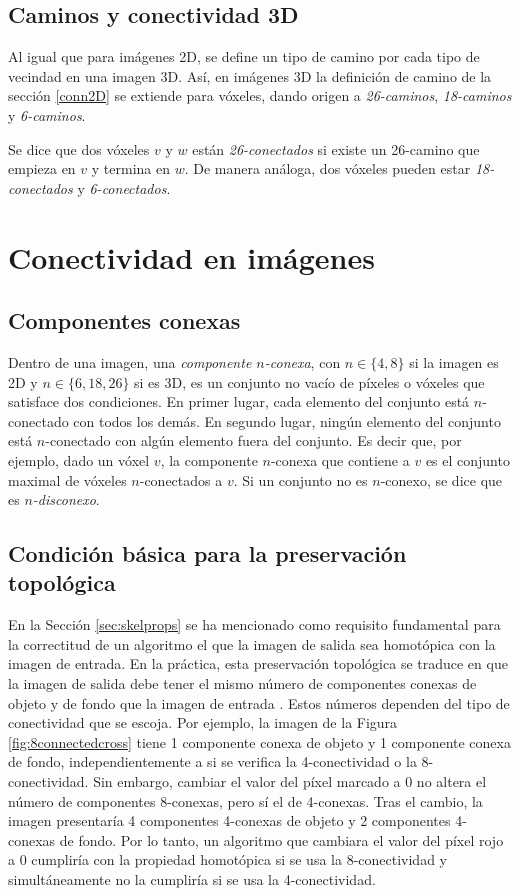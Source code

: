 \subsection{Caminos y conectividad 3D}

Al igual que para imágenes 2D, se define un tipo de camino por cada tipo de vecindad en una imagen 3D. Así, en imágenes 3D la definición de camino de la sección \ref{conn2D} se extiende para vóxeles, dando origen a \textit{26-caminos}, \textit{18-caminos} y \textit{6-caminos}.

Se dice que dos vóxeles $v$ y $w$ están \textit{26-conectados} si existe un 26-camino que empieza en $v$ y termina en $w$. De manera análoga, dos vóxeles pueden estar \textit{18-conectados} y \textit{6-conectados}.

\section{Conectividad en imágenes}

\subsection{Componentes conexas}

Dentro de una imagen, una \textit{componente $n$-conexa}, con $n \in \{4, 8\}$ si la imagen es 2D y $n \in \{6, 18, 26\}$ si es 3D, es un conjunto no vacío de píxeles o vóxeles que satisface dos condiciones. En primer lugar, cada elemento del conjunto está $n$-conectado con todos los demás. En segundo lugar, ningún elemento del conjunto está $n$-conectado con algún elemento fuera del conjunto. Es decir que, por ejemplo, dado un vóxel $v$, la componente $n$-conexa que contiene a $v$ es el conjunto maximal de vóxeles $n$-conectados a $v$. Si un conjunto no es $n$-conexo, se dice que es \textit{$n$-disconexo}.

\subsection{Condición básica para la preservación topológica} \label{ssec:fakehomotopy}

En la Sección \ref{sec:skelprops} se ha mencionado como requisito fundamental para la correctitud de un algoritmo el que la imagen de salida sea homotópica con la imagen de entrada. En la práctica, esta preservación topológica se traduce en que la imagen de salida debe tener el mismo número de componentes conexas de objeto y de fondo que la imagen de entrada \cite{saha1994topology}. Estos números dependen del tipo de conectividad que se escoja. Por ejemplo, la imagen de la Figura \ref{fig:8connectedcross} tiene 1 componente conexa de objeto y 1 componente conexa de fondo, independientemente a si se verifica la 4-conectividad o la 8-conectividad. Sin embargo, cambiar el valor del píxel marcado a 0 no altera el número de componentes 8-conexas, pero sí el de 4-conexas. Tras el cambio, la imagen presentaría 4 componentes 4-conexas de objeto y 2 componentes 4-conexas de fondo. Por lo tanto, un algoritmo que cambiara el valor del píxel rojo a 0 cumpliría con la propiedad homotópica si se usa la 8-conectividad y simultáneamente no la cumpliría si se usa la 4-conectividad.

